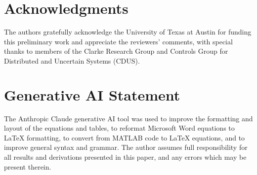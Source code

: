 \documentclass[conf]{new-aiaa}
\begin{document}
\section*{Acknowledgments}

The authors gratefully acknowledge the University of Texas at Austin for funding this preliminary work and appreciate the reviewers’ comments, with special thanks to members of the Clarke Research Group and Controls Group for Distributed and Uncertain Systems (CDUS).

\section*{Generative AI Statement}

The Anthropic Claude \cite{refs:claude} generative AI tool was used to improve the formatting and layout of the equations and tables, to reformat Microsoft Word equations to LaTeX formatting, to convert from MATLAB code to LaTeX equations, and to improve general syntax and grammar. The author assumes full responsibility for all results and derivations presented in this paper, and any errors which may be present therein.


\end{document}
